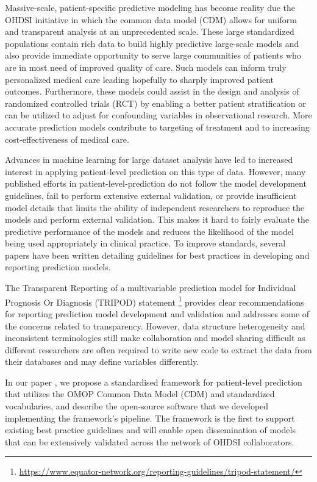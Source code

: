 \documentclass[11pt]{book}
\let\rmarkdownfootnote\footnote%
\def\footnote{\protect\rmarkdownfootnote}
\theoremstyle{definition}
\theoremstyle{definition}
\theoremstyle{definition}
\theoremstyle{remark}
\begin{document}
Massive-scale, patient-specific predictive modeling has become reality due the OHDSI initiative in which the common data model (CDM) allows for uniform and transparent analysis at an unprecedented scale. These large standardized populations contain rich data to build highly predictive large-scale models and also provide immediate opportunity to serve large communities of patients who are in most need of improved quality of care. Such models can inform truly personalized medical care leading hopefully to sharply improved patient outcomes. Furthermore, these models could assist in the design and analysis of randomized controlled trials (RCT) by enabling a better patient stratification or can be utilized to adjust for confounding variables in observational research. More accurate prediction models contribute to targeting of treatment and to increasing cost-effectiveness of medical care.

Advances in machine learning for large dataset analysis have led to increased interest in applying patient-level prediction on this type of data. However, many published efforts in patient-level-prediction do not follow the model development guidelines, fail to perform extensive external validation, or provide insufficient model details that limits the ability of independent researchers to reproduce the models and perform external validation. This makes it hard to fairly evaluate the predictive performance of the models and reduces the likelihood of the model being used appropriately in clinical practice. To improve standards, several papers have been written detailing guidelines for best practices in developing and reporting prediction models.

The Transparent Reporting of a multivariable prediction model for Individual Prognosis Or Diagnosis (TRIPOD) statement \footnote{\url{https://www.equator-network.org/reporting-guidelines/tripod-statement/}} provides clear recommendations for reporting prediction model development and validation and addresses some of the concerns related to transparency. However, data structure heterogeneity and inconsistent terminologies still make collaboration and model sharing difficult as different researchers are often required to write new code to extract the data from their databases and may define variables differently.

In our paper \citep{reps2018}, we propose a standardised framework for patient-level prediction that utilizes the OMOP Common Data Model (CDM) and standardized vocabularies, and describe the open-source software that we developed implementing the framework's pipeline. The framework is the first to support existing best practice guidelines and will enable open dissemination of models that can be extensively validated across the network of OHDSI collaborators.
\end{document}
